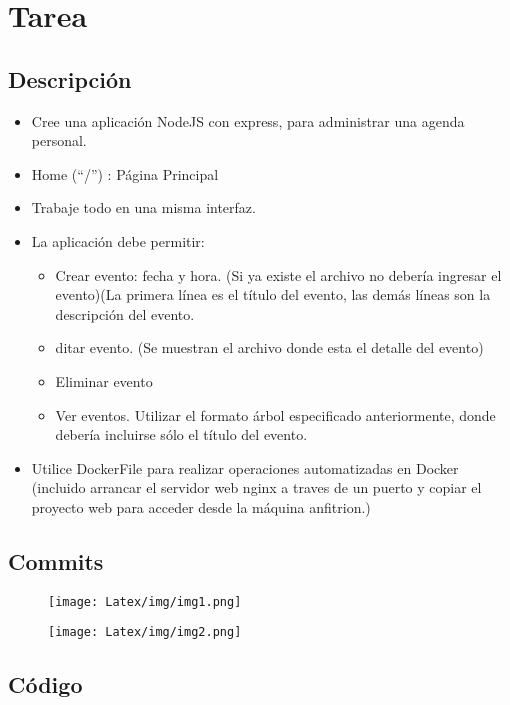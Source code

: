 \documentclass{article}
\begin{document}
\section{Tarea}
\subsection{Descripción}
\begin{itemize}
\item{Cree una aplicación NodeJS con express, para administrar una agenda personal.}
\item{Home (“/”) : Página Principal}
\item{Trabaje todo en una misma interfaz.}
\item{La aplicación debe permitir:}
\begin{itemize}
    \item{Crear evento: fecha y hora. (Si ya existe el archivo no debería ingresar el evento)(La primera
línea es el título del evento, las demás líneas son la descripción del evento.}
\item{ditar evento. (Se muestran el archivo donde esta el detalle del evento)
}
\item{Eliminar evento}
\item{Ver eventos. Utilizar el formato árbol especificado anteriormente, donde debería incluirse
sólo el título del evento.
}
\end{itemize}
\item{Utilice DockerFile para realizar operaciones automatizadas en Docker (incluido arrancar el servidor web nginx a traves de un puerto y copiar el proyecto web para acceder desde la máquina
anfitrion.)}
\end{itemize}

\subsection{Commits}
\begin{figure}[H]
    \centering
    \texttt{[image: Latex/img/img1.png]}
\end{figure}
\begin{figure}[H]
    \centering
    \texttt{[image: Latex/img/img2.png]}
\end{figure}
\subsection{Código}
\end{document}
